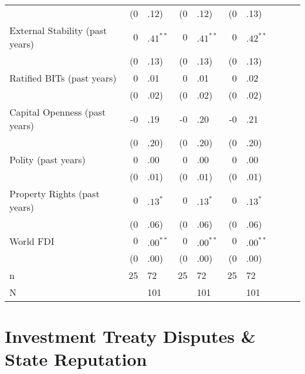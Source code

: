 \documentclass[12pt,onesided]{amsart}
\begin{document}
\begin{table}[ht]
{\begin{tabular}{lr@{} lr@{}lr@{}lr@{}lr@{}}
   & (0&.12) & (0&.12) & (0&.13) \\ 
  External Stability (past  years) & $0$&$.41^{\ast\ast}$ & $0$&$.41^{\ast\ast}$ & $0$&$.42^{\ast\ast}$ \\ 
   & (0&.13) & (0&.13) & (0&.13) \\ 
  Ratified BITs (past  years) & 0&.01 & 0&.01 & 0&.02 \\ 
   & (0&.02) & (0&.02) & (0&.02) \\ 
  Capital Openness (past  years) & -0&.19 & -0&.20 & -0&.21 \\ 
   & (0&.20) & (0&.20) & (0&.20) \\ 
  Polity (past  years) & 0&.00 & 0&.00 & 0&.00 \\ 
   & (0&.01) & (0&.01) & (0&.01) \\ 
  Property Rights (past  years) & $0$&$.13^{\ast}$ & $0$&$.13^{\ast}$ & $0$&$.13^{\ast}$ \\ 
   & (0&.06) & (0&.06) & (0&.06) \\ 
  World FDI & $0$&$.00^{\ast\ast}$ & $0$&$.00^{\ast\ast}$ & $0$&$.00^{\ast\ast}$ \\ 
   & (0&.00) & (0&.00) & (0&.00) \\ 
   \hline
n & 25&72 & 25&72 & 25&72 \\ 
  N && 101 && 101 && 101 \\ 
   \hline
\hline
\end{tabular}
}
\end{table}

\section*{Investment Treaty Disputes \& State Reputation}
\end{document}
